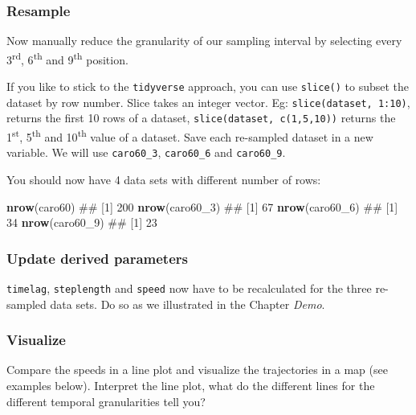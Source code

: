\documentclass[]{book}
\newenvironment{Shaded}{\begin{snugshade}}{\end{snugshade}}
\newcommand{\KeywordTok}[1]{\textcolor[rgb]{0.13,0.29,0.53}{\textbf{#1}}}
\newcommand{\DecValTok}[1]{\textcolor[rgb]{0.00,0.00,0.81}{#1}}
\newcommand{\NormalTok}[1]{#1}
\begin{document}
\subsubsection{Resample}\label{resample}

Now manually reduce the granularity of our sampling interval by
selecting every 3\textsuperscript{rd}, 6\textsuperscript{th} and
9\textsuperscript{th} position.

If you like to stick to the \texttt{tidyverse} approach, you can use
\texttt{slice()} to subset the dataset by row number. Slice takes an
integer vector. Eg: \texttt{slice(dataset,\ 1:10)}, returns the first 10
rows of a dataset, \texttt{slice(dataset,\ c(1,5,10))} returns the
1\textsuperscript{st}, 5\textsuperscript{th} and 10\textsuperscript{th}
value of a dataset. Save each re-sampled dataset in a new variable. We
will use \texttt{caro60\_3}, \texttt{caro60\_6} and \texttt{caro60\_9}.

You should now have 4 data sets with different number of rows:

\begin{Shaded}
\begin{Highlighting}[]
\KeywordTok{nrow}\NormalTok{(caro60)}
\NormalTok{## [1] 200}
\KeywordTok{nrow}\NormalTok{(caro60_}\DecValTok{3}\NormalTok{)}
\NormalTok{## [1] 67}
\KeywordTok{nrow}\NormalTok{(caro60_}\DecValTok{6}\NormalTok{)}
\NormalTok{## [1] 34}
\KeywordTok{nrow}\NormalTok{(caro60_}\DecValTok{9}\NormalTok{)}
\NormalTok{## [1] 23}
\end{Highlighting}
\end{Shaded}

\subsubsection{Update derived
parameters}\label{update-derived-parameters}

\texttt{timelag}, \texttt{steplength} and \texttt{speed} now have to be
recalculated for the three re-sampled data sets. Do so as we illustrated
in the Chapter \emph{Demo}.

\subsubsection{Visualize}\label{visualize}

Compare the speeds in a line plot and visualize the trajectories in a
map (see examples below). Interpret the line plot, what do the different
lines for the different temporal granularities tell you?
\end{document}
